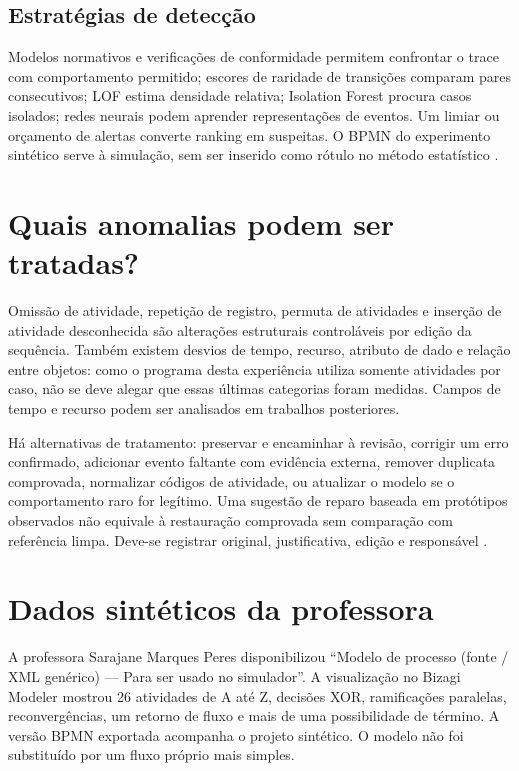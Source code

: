 \documentclass[conference]{IEEEtran}
\begin{document}
\subsection{Estratégias de detecção}
Modelos normativos e verificações de conformidade permitem confrontar o trace com comportamento permitido; escores de raridade de transições comparam pares consecutivos; LOF estima densidade relativa; Isolation Forest procura casos isolados; redes neurais podem aprender representações de eventos. Um limiar ou orçamento de alertas converte ranking em suspeitas. O BPMN do experimento sintético serve à simulação, sem ser inserido como rótulo no método estatístico \cite{breunig2000lof,liu2008isolation}.

\clearpage
\section{Quais anomalias podem ser tratadas?}
Omissão de atividade, repetição de registro, permuta de atividades e inserção de atividade desconhecida são alterações estruturais controláveis por edição da sequência. Também existem desvios de tempo, recurso, atributo de dado e relação entre objetos: como o programa desta experiência utiliza somente atividades por caso, não se deve alegar que essas últimas categorias foram medidas. Campos de tempo e recurso podem ser analisados em trabalhos posteriores.

Há alternativas de tratamento: preservar e encaminhar à revisão, corrigir um erro confirmado, adicionar evento faltante com evidência externa, remover duplicata comprovada, normalizar códigos de atividade, ou atualizar o modelo se o comportamento raro for legítimo. Uma sugestão de reparo baseada em protótipos observados não equivale à restauração comprovada sem comparação com referência limpa. Deve-se registrar original, justificativa, edição e responsável \cite{weske2024bpm,suriadi2017patterns}.

\section{Dados sintéticos da professora}
A professora Sarajane Marques Peres disponibilizou ``Modelo de processo (fonte / XML genérico) --- Para ser usado no simulador''. A visualização no Bizagi Modeler mostrou 26 atividades de A até Z, decisões XOR, ramificações paralelas, reconvergências, um retorno de fluxo e mais de uma possibilidade de término. A versão BPMN exportada acompanha o projeto sintético. O modelo não foi substituído por um fluxo próprio mais simples.
\end{document}

